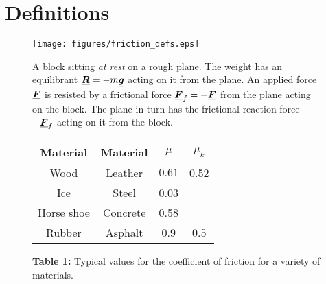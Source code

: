 



\addtolength{\topmargin}{-0.7 cm}
\setlength{\columnsep}{22pt}


\section{Definitions}
\begin{wrapfigure}{r}{7cm}\vspace{-2cm}
\center
\texttt{[image: figures/friction\_defs.eps]}
\caption{A block sitting \textit{at rest }on a rough plane.  The weight has an equilibrant $\mathit{\underline{\boldsymbol{R}}} = - m\mathit{\underline{\boldsymbol{g}}}$ acting on it from the plane.  An applied force $\mathit{\underline{\boldsymbol{F}}}$ is resisted by a frictional force $\mathit{\underline{\boldsymbol{F}}}_f = -\mathit{\underline{\boldsymbol{F}}}$ from the plane acting on the block.  The plane in turn has the frictional reaction force $-\mathit{\underline{\boldsymbol{F}}}_f$ acting on it from the block.}\vspace{1.0cm}
\label{fig:friction-defs}

  \begin{tabular}{|c|c|c|c|}
\hline
Material & Material & $\mu$ & $\mu_k$\\
\hline
\hline
   Wood & Leather &$0.61$& 0.52 \\
   \hline
   Ice & Steel &0.03& \\
    \hline
   Horse shoe   & Concrete &0.58& \\
 \hline
   Rubber & Asphalt &0.9&0.5 \\
   \hline

  \end{tabular}
  \caption*{{\bf Table 1:} Typical values for the coefficient of friction for a variety of materials.}\vspace{-0.7cm}\label{tab:coeffs}
 \end{wrapfigure}

